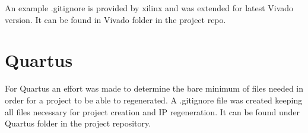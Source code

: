 An example .gitignore is provided by xilinx and was extended for latest Vivado version. It can be found in Vivado folder in the project repo.

\section{Quartus}
For Quartus an effort was made to determine the bare minimum of files needed in order for a project to be able to regenerated. 
A .gitignore file was created keeping all files necessary for project creation and IP regeneration. It can be found under Quartus folder in the project repository.